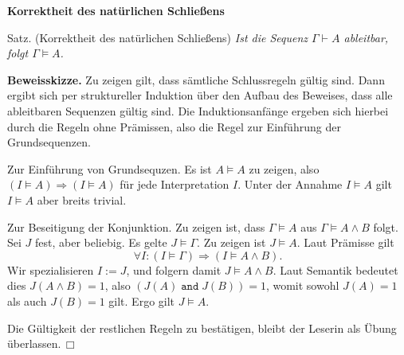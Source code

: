 \documentclass[8pt]{beamer}
\newcommand{\strong}[1]{\textsf{\textbf{#1}}}
\renewcommand{\qedsymbol}{\ensuremath{\Box}}
\newcommand{\centerheadline}[1]{%
  \begin{center}\strong{#1}\end{center}}
\newcommand{\parspace}{\vspace{0.8em}}
\begin{document}
\begin{frame}
\centerheadline{Korrektheit des natürlichen Schließens}
\end{frame}

\begin{frame}
\begin{block}{Satz. (Korrektheit des natürlichen Schließens)}
\emph{Ist die Sequenz $\Gamma\vdash A$ ableitbar, folgt $\Gamma\models A$.}
\end{block}

\strong{Beweisskizze.} Zu zeigen gilt, dass sämtliche Schlussregeln
gültig sind. Dann ergibt sich per struktureller Induktion über den Aufbau
des Beweises, dass alle ableitbaren Sequenzen gültig sind. Die
Induktionsanfänge ergeben sich hierbei durch die Regeln ohne Prämissen,
also die Regel zur Einführung der Grundsequenzen.\pause

\parspace
Zur Einführung von Grundsequzen. Es ist $A\models A$ zu zeigen,
also $(I\models A)\Rightarrow (I\models A)$ für jede Interpretation $I$.
Unter der Annahme $I\models A$ gilt $I\models A$ aber breits trivial.\pause

\parspace
Zur Beseitigung der Konjunktion. Zu zeigen ist, dass $\Gamma\models A$
aus $\Gamma\models A\land B$ folgt. Sei $J$ fest, aber beliebig.
Es gelte $J\models\Gamma$. Zu zeigen ist $J\models A$. Laut Prämisse
gilt
\[\forall I\colon (I\models\Gamma)\Rightarrow (I\models A\land B).\]
Wir spezialisieren $I:=J$, und folgern damit $J\models A\land B$.
Laut Semantik bedeutet dies $J(A\land B)=1$, also
$(J(A)\;\texttt{and}\;J(B))=1$, womit sowohl $J(A)=1$ als auch $J(B)=1$
gilt. Ergo gilt $J\models A$.\pause

\parspace
Die Gültigkeit der restlichen Regeln zu bestätigen, bleibt der Leserin
als Übung überlassen.\,\qedsymbol
\end{frame}
\end{document}
